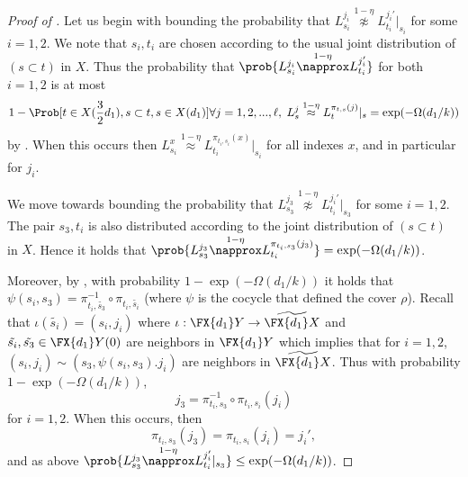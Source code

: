 \begin{proof}[Proof of ]
Let us begin with bounding the probability that \(L_{s_i}^{j_i} \overset{1-\eta}{\napprox} L_{t_i}^{j_i'}|_{s_i}\) for some \(i=1,2\). We note that \(s_i,t_i\) are chosen according to the usual joint distribution of \((s\subset t)\) in \(X\). Thus the probability that \(\prob{L_{s_i}^{j_i} \overset{1-\eta}{\napprox} L_{t_i}^{j_i'}}\) for both \(i=1,2\) is at most
\[1-\Prob[t\in X(\frac{3}{2}d_1),s\subset t, s\in X(d_1)]{\forall j=1,2,...,\ell, \; L_s^j \overset{1-\eta}{\approx} L_t^{\pi_{t,s}(j)}|_s} = \exp(-\Omega(d_1/k))\]
by . When this occurs then \(L_{s_i}^{x} \overset{1-\eta}{\approx} L_{t_i}^{\pi_{t_i,s_i}(x)}|_{s_i}\) for all indexes \(x\), and in particular for \(j_i\).

We move towards bounding the probability that \(L_{s_3}^{j_3} \overset{1-\eta}{\napprox} L_{t_i}^{j_i'}|_{s_3}\) for some \(i=1,2\). The pair \(s_3,t_i\) is also distributed according to the joint distribution of \((s\subset t)\) in \(X\). Hence it holds that \(\prob{L_{s_3}^{j_3} \overset{1-\eta}{\napprox} L_{t_i}^{\pi_{t_i,s_3}(j_3)}} = \exp(-\Omega(d_1/k))\).

Moreover, by , with probability \(1- \exp(-\Omega(d_1/k))\) it holds that \(\psi(s_i, s_3)=\pi_{t_i,\tilde{s_3}}^{-1} \circ \pi_{t_i,\tilde{s_i}}\) (where \(\psi\) is the cocycle that defined the cover \(\rho\)). Recall that \(\iota(\tilde{s_i})=(s_i,j_i)\) where \(\iota:\FX{d_1}Y \to \widetilde{\FX{d_1}X}\) and \(\tilde{s_i},\tilde{s_3} \in \FX{d_1}Y(0)\) are neighbors in \(\FX{d_1}Y\) which implies that for \(i=1,2\), \((s_i,j_i) \sim (s_3,\psi(s_i,s_3) . j_i)\) are neighbors in \(\widetilde{\FX{d_1}X}\). Thus with probability \(1- \exp(-\Omega(d_1/k))\), 
\[j_3 = \pi_{t_i,s_3}^{-1} \circ \pi_{t_i,s_i}(j_i)\]
for \(i=1,2\). When this occurs, then
\[\pi_{t_i,s_3}(j_3) = \pi_{t_i,s_i}(j_i)=j_i',\]
and as above \(\prob{L_{s_3}^{j_3} \overset{1-\eta}{\napprox} L_{t_i}^{j_i'}|_{s_3}} \leq \exp(-\Omega(d_1/k))\).

\end{proof}

